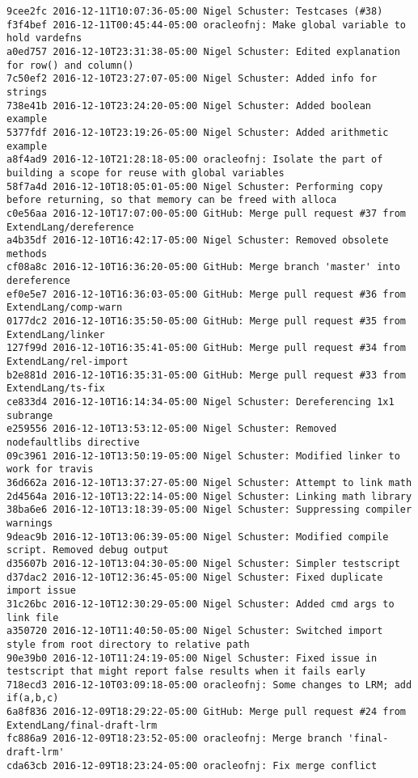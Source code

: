 \begin{lstlisting}
9cee2fc 2016-12-11T10:07:36-05:00 Nigel Schuster: Testcases (#38)
f3f4bef 2016-12-11T00:45:44-05:00 oracleofnj: Make global variable to hold vardefns
a0ed757 2016-12-10T23:31:38-05:00 Nigel Schuster: Edited explanation for row() and column()
7c50ef2 2016-12-10T23:27:07-05:00 Nigel Schuster: Added info for strings
738e41b 2016-12-10T23:24:20-05:00 Nigel Schuster: Added boolean example
5377fdf 2016-12-10T23:19:26-05:00 Nigel Schuster: Added arithmetic example
a8f4ad9 2016-12-10T21:28:18-05:00 oracleofnj: Isolate the part of building a scope for reuse with global variables
58f7a4d 2016-12-10T18:05:01-05:00 Nigel Schuster: Performing copy before returning, so that memory can be freed with alloca
c0e56aa 2016-12-10T17:07:00-05:00 GitHub: Merge pull request #37 from ExtendLang/dereference
a4b35df 2016-12-10T16:42:17-05:00 Nigel Schuster: Removed obsolete methods
cf08a8c 2016-12-10T16:36:20-05:00 GitHub: Merge branch 'master' into dereference
ef0e5e7 2016-12-10T16:36:03-05:00 GitHub: Merge pull request #36 from ExtendLang/comp-warn
0177dc2 2016-12-10T16:35:50-05:00 GitHub: Merge pull request #35 from ExtendLang/linker
127f99d 2016-12-10T16:35:41-05:00 GitHub: Merge pull request #34 from ExtendLang/rel-import
b2e881d 2016-12-10T16:35:31-05:00 GitHub: Merge pull request #33 from ExtendLang/ts-fix
ce833d4 2016-12-10T16:14:34-05:00 Nigel Schuster: Dereferencing 1x1 subrange
e259556 2016-12-10T13:53:12-05:00 Nigel Schuster: Removed nodefaultlibs directive
09c3961 2016-12-10T13:50:19-05:00 Nigel Schuster: Modified linker to work for travis
36d662a 2016-12-10T13:37:27-05:00 Nigel Schuster: Attempt to link math
2d4564a 2016-12-10T13:22:14-05:00 Nigel Schuster: Linking math library
38ba6e6 2016-12-10T13:18:39-05:00 Nigel Schuster: Suppressing compiler warnings
9deac9b 2016-12-10T13:06:39-05:00 Nigel Schuster: Modified compile script. Removed debug output
d35607b 2016-12-10T13:04:30-05:00 Nigel Schuster: Simpler testscript
d37dac2 2016-12-10T12:36:45-05:00 Nigel Schuster: Fixed duplicate import issue
31c26bc 2016-12-10T12:30:29-05:00 Nigel Schuster: Added cmd args to link file
a350720 2016-12-10T11:40:50-05:00 Nigel Schuster: Switched import style from root directory to relative path
90e39b0 2016-12-10T11:24:19-05:00 Nigel Schuster: Fixed issue in testscript that might report false results when it fails early
718ecd3 2016-12-10T03:09:18-05:00 oracleofnj: Some changes to LRM; add if(a,b,c)
6a8f836 2016-12-09T18:29:22-05:00 GitHub: Merge pull request #24 from ExtendLang/final-draft-lrm
fc886a9 2016-12-09T18:23:52-05:00 oracleofnj: Merge branch 'final-draft-lrm'
cda63cb 2016-12-09T18:23:24-05:00 oracleofnj: Fix merge conflict

\end{lstlisting}
